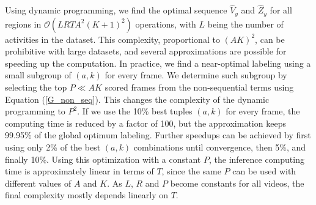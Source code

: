 Using dynamic programming, we find the optimal sequence $\hat{V}_y$ and $\hat{Z}_y$ for all regions in $\mathcal{O}(LRTA^2(K+1)^2)$ operations, with $L$ being the number of activities in the dataset.
%
This complexity, proportional to $(AK)^2$, can be prohibitive with large datasets, and several approximations are possible for speeding up
the computation.
In practice, we find a near-optimal labeling using a small subgroup of $(a,k)$ for every frame.
We determine such subgroup by selecting the top $P \ll AK$ scored frames from the non-sequential
terms using Equation (\ref{G_non_seq}). This changes the complexity of the dynamic programming
to $P^2$.
If we use the 10\% best tuples $(a,k)$ for every frame, the computing time is reduced by a
factor of 100, but the approximation keeps 99.95\% of the global optimum labeling.
Further speedups can be achieved by first using only 2\% of the best $(a,k)$
combinations until convergence, then 5\%, and finally 10\%. Using this optimization with a constant $P$, the inference computing time is approximately linear in terms of $T$, since the same $P$ can be used with different values of $A$ and $K$. As $L$, $R$ and $P$ become constants for all videos, the final complexity mostly depends linearly on $T$.

